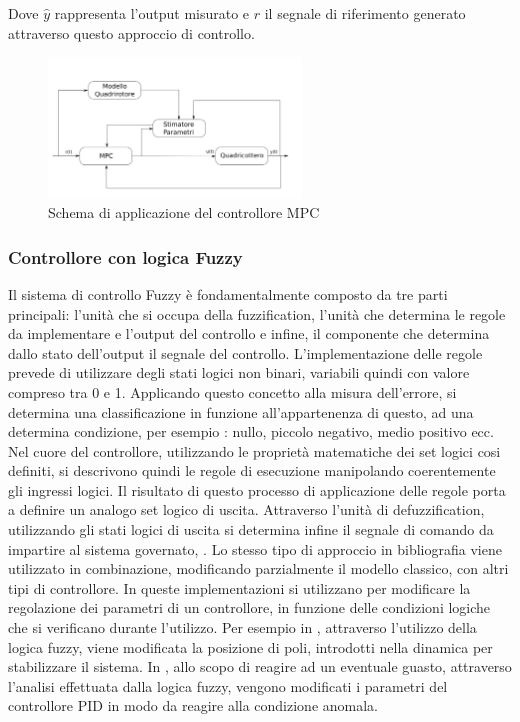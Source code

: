 Dove $\hat{y}$ rappresenta l'output misurato e $r$ il segnale di riferimento generato attraverso questo approccio di controllo.

\begin{figure}
	\centering
	\includegraphics[width=0.6\textwidth]{SistemaQuadrirotore/Figure/MPC}
	\caption{Schema di applicazione del controllore MPC}
\end{figure}

\subsubsection{Controllore con logica Fuzzy}

Il sistema di controllo Fuzzy è fondamentalmente composto da tre parti principali: l'unità che si occupa della fuzzification, l'unità che determina le regole da implementare e l'output del controllo e infine, il componente che determina dallo stato dell'output il segnale del controllo. 
L'implementazione delle regole prevede di utilizzare degli stati logici non binari, variabili quindi con valore compreso tra 0 e 1. Applicando questo concetto alla misura dell'errore, si determina una classificazione in funzione all'appartenenza di questo, ad una determina condizione, per esempio : nullo, piccolo negativo, medio positivo  ecc.
Nel cuore del controllore, utilizzando le proprietà matematiche dei set logici cosi definiti, si descrivono quindi le regole di esecuzione manipolando coerentemente gli ingressi logici. Il risultato di questo processo di applicazione delle regole porta a definire un analogo set logico di uscita. Attraverso l'unità di defuzzification, utilizzando gli stati logici di uscita si determina infine il segnale di comando da impartire al sistema governato, \cite{ChenGuanrong2001ItFS}.
Lo stesso tipo di approccio in bibliografia viene utilizzato in combinazione, modificando parzialmente il modello classico, con altri tipi di controllore. In queste implementazioni si utilizzano per modificare la regolazione dei parametri di un controllore, in funzione delle condizioni logiche che si verificano durante l'utilizzo.
Per esempio in \cite{6988024}, attraverso l'utilizzo della logica fuzzy, viene modificata la posizione di poli, introdotti nella dinamica per stabilizzare il sistema. In \cite{AmoozgarMohammadHadi2012FFGP}, allo scopo di reagire ad un eventuale guasto, attraverso l'analisi effettuata dalla logica fuzzy, vengono modificati i parametri del controllore PID in modo da reagire alla condizione anomala.


